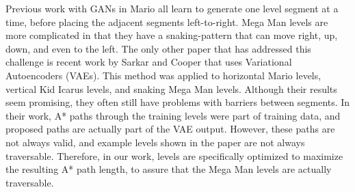 Previous work with GANs in Mario \cite{volz:gecco2018,fontaine2020illuminating,schrum:gecco2020cppn2gan,schrum2020interactive} all learn to generate one level segment at a time, before placing the adjacent segments left-to-right. Mega Man levels are more complicated in that they have a snaking-pattern that can move right, up, down, and even to the left. The only other paper that has addressed this challenge is recent work by Sarkar and Cooper \cite{sarkar:fdg2020} that uses Variational Autoencoders (VAEs). This method was applied to horizontal Mario levels, vertical Kid Icarus levels, and snaking Mega Man levels. Although their results seem promising, they often still have problems with barriers between segments. In their work, A* paths through the training levels were part of training data, and proposed paths are actually part of the VAE output. However, these paths are not always valid, and example levels shown in the paper are not always traversable. Therefore, in our work, levels are specifically optimized to maximize the resulting A* path length, to assure that the Mega Man levels are actually traversable.




